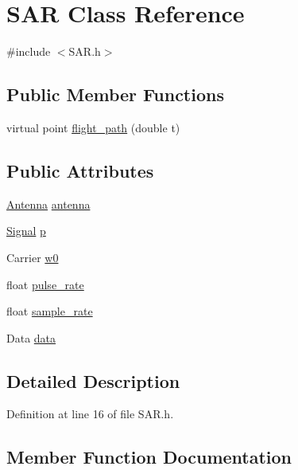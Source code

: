 \hypertarget{class_s_a_r}{}\section{S\+AR Class Reference}
\label{class_s_a_r}


{\ttfamily \#include $<$S\+A\+R.\+h$>$}

\subsection*{Public Member Functions}
\begin{DoxyCompactItemize}
\item 
virtual point \hyperlink{class_s_a_r_ad8d31777e5b21cbfb75e5023830eb011}{flight\+\_\+path} (double t)
\end{DoxyCompactItemize}
\subsection*{Public Attributes}
\begin{DoxyCompactItemize}
\item 
\hyperlink{class_antenna}{Antenna} \hyperlink{class_s_a_r_a834de6d160196af5d7ea31c4140fb684}{antenna}
\item 
\hyperlink{class_signal}{Signal} \hyperlink{class_s_a_r_aa854bd6cbba87d014da962bea7a5e6d8}{p}
\item 
Carrier \hyperlink{class_s_a_r_a6108faaee083fa177cf3b837486a667f}{w0}
\item 
float \hyperlink{class_s_a_r_ad85918c46f8ea542f28a65a2f45b3962}{pulse\+\_\+rate}
\item 
float \hyperlink{class_s_a_r_aca187a89a350101ca7d1fad4d432f27b}{sample\+\_\+rate}
\item 
Data \hyperlink{class_s_a_r_a36a5fb0ba45e7fafc60cce11664fd81d}{data}
\end{DoxyCompactItemize}


\subsection{Detailed Description}


Definition at line 16 of file S\+A\+R.\+h.



\subsection{Member Function Documentation}
\mbox{\label{class_s_a_r_ad8d31777e5b21cbfb75e5023830eb011}} 
